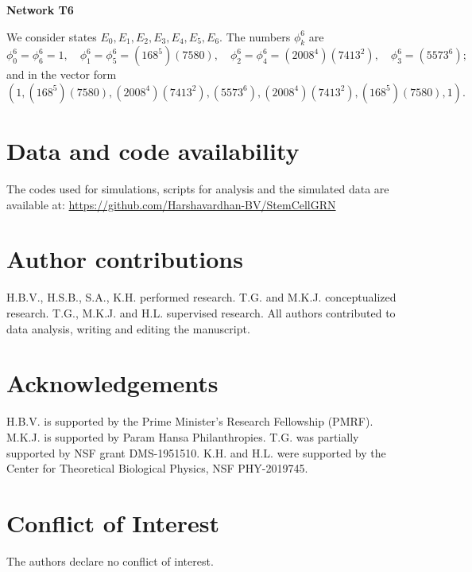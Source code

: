 \documentclass[11pt,a4paper]{article}
\theoremstyle{definition}
\theoremstyle{remark}
\begin{document}
{\bf  Network T6  }

We consider states $ E_0, E_1, E_2, E_3, E_4, E_5, E_6 $. The numbers $\phi^6_k$ are 
\[
\phi^6_0 = \phi^6_6 = 1 , \quad \phi^6_1 = \phi^6_5 = (168^5)(7580), \quad \phi^6_2 = \phi^6_4 = (2008^4)(7413^2), \quad \phi^6_3  = (5573^6);
\]
and in the vector form
\[ (1, (168^5)(7580), (2008^4)(7413^2), (5573^6), (2008^4)(7413^2), (168^5)(7580), 1) .\]


\section*{Data and code availability}
The codes used for simulations, scripts for analysis and the simulated data are available at: \url{https://github.com/Harshavardhan-BV/StemCellGRN}

\section*{Author contributions}
H.B.V., H.S.B., S.A., K.H. performed research. T.G. and M.K.J. conceptualized research. T.G., M.K.J. and H.L. supervised research. All authors contributed to data analysis, writing and editing the manuscript.

\section*{Acknowledgements}
H.B.V. is supported by the Prime Minister’s Research Fellowship (PMRF). M.K.J. is supported by Param Hansa Philanthropies. T.G. was partially supported by  NSF grant DMS-1951510. K.H. and H.L. were supported by the Center for Theoretical Biological Physics, NSF PHY-2019745.

\section*{Conflict of Interest}
The authors declare no conflict of interest.

\printbibliography 
\newpage
\end{document}

